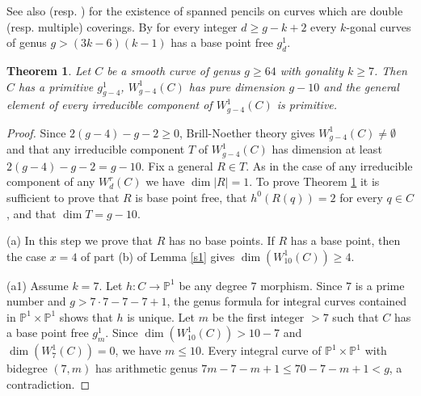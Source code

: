 \documentclass{amsart}
\theoremstyle{plain}
\newtheorem{theorem}{Theorem}
\theoremstyle{definition}
\begin{document}
See also \cite{bkp}  (resp. \cite{bks}) for the existence of spanned pencils on curves which are double (resp. multiple) coverings. By \cite[Theorem 2.2]{bk2} for every integer
$d\ge g-k+2$ every $k$-gonal
curves of genus $g > (3k - 6)(k - 1)$ has a base point free $g^1_d$.

\begin{theorem}\label{s1.0}
Let $C$ be a smooth curve of genus $g\ge 64$ with gonality $k\ge 7$. Then $C$ has a primitive $g^1_{g-4}$, $W^1_{g-4}({C})$ has pure dimension $g-10$ and the general element of every irreducible component of $W^1_{g-4}({C})$ is primitive.
\end{theorem}

\begin{proof}
Since $2(g-4) -g -2 \ge 0$, Brill-Noether theory gives $W^1_{g-4}({C}) \ne \emptyset$ and that any irreducible component $T$ of $W^1_{g-4}({C})$ has dimension at least $2(g-4)-g-2 =g-10$.  Fix a general $R\in T$. As in the case of any irreducible component of any $W^r_d({C})$ we have $\dim |R| =1$. To prove Theorem \ref{s1.0}
it is sufficient to prove that $R$ is base point free, that $h^0(R(q)) = 2$ for every $q\in C$, and that $\dim T =g-10$.

\quad (a) In this step we prove that $R$ has no base points. If $R$ has a base point, then the case $x=4$ of part (b) of Lemma \ref{s1}
gives $\dim (W^1_{10}({C})) \ge 4$.

\quad (a1) Assume $k=7$. Let $h: C\to \mathbb {P}^1$ be any degree $7$ morphism. Since $7$ is a prime number and $g>7\cdot 7 -7-7+1$, the genus formula for integral
curves contained in $\mathbb {P}^1\times \mathbb {P}^1$ shows that $h$ is unique. Let $m$ be the first integer $>7$ such that $C$ has a base point free $g^1_m$.
Since  $\dim (W^1_{10}({C}))> 10-7$ and $\dim (W^1_7({C})) =0$, we have $m\le 10$. Every integral curve of $\mathbb {P}^1\times \mathbb {P}^1$ with bidegree $(7,m)$
has arithmetic genus $7m-7-m+1 \le 70-7-m+1 <g$, a contradiction.


\end{proof}
\end{document}
